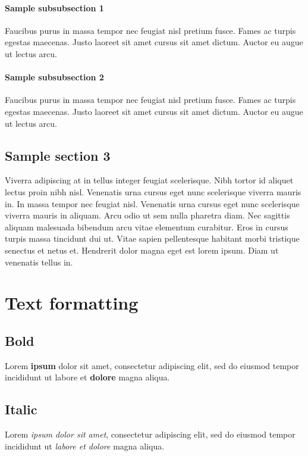 \documentclass[a4paper, 12pt]{report}
\begin{document}
\subsubsection{Sample subsubsection 1}
Faucibus purus in massa tempor nec feugiat nisl pretium fusce. Fames ac turpis egestas maecenas. Justo laoreet sit amet cursus sit amet dictum. Auctor eu augue ut lectus arcu.

\subsubsection{Sample subsubsection 2}
Faucibus purus in massa tempor nec feugiat nisl pretium fusce. Fames ac turpis egestas maecenas. Justo laoreet sit amet cursus sit amet dictum. Auctor eu augue ut lectus arcu.


\section{Sample section 3}
Viverra adipiscing at in tellus integer feugiat scelerisque. Nibh tortor id aliquet lectus proin nibh nisl. Venenatis urna cursus eget nunc scelerisque viverra mauris in. In massa tempor nec feugiat nisl. Venenatis urna cursus eget nunc scelerisque viverra mauris in aliquam. Arcu odio ut sem nulla pharetra diam. Nec sagittis aliquam malesuada bibendum arcu vitae elementum curabitur. Eros in cursus turpis massa tincidunt dui ut. Vitae sapien pellentesque habitant morbi tristique senectus et netus et. Hendrerit dolor magna eget est lorem ipsum. Diam ut venenatis tellus in.





\chapter{Text formatting}
\section{Bold}
Lorem \textbf{ipsum} dolor sit amet, consectetur adipiscing elit, sed do eiusmod tempor incididunt ut labore et \textbf{dolore} magna aliqua.

\section{Italic}
Lorem \textit{ipsum dolor sit amet}, consectetur adipiscing elit, sed do eiusmod tempor incididunt ut \textit{labore et dolore} magna aliqua.
\end{document}
